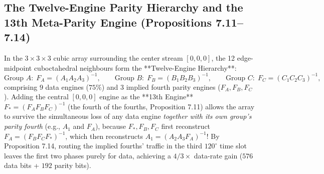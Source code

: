 \documentclass[11pt, a4paper]{article}
\begin{document}
\subsection{The Twelve-Engine Parity Hierarchy and the 13th Meta-Parity Engine (Propositions 7.11--7.14)}
In the $3\times 3\times 3$ cubic array surrounding the center stream $[0,0,0]$, the 12 edge-midpoint cuboctahedral neighbours form the **Twelve-Engine Hierarchy**:
\begin{equation}
\text{Group } A: \; F_A = (A_1 A_2 A_3)^{-1}, \qquad \text{Group } B: \; F_B = (B_1 B_2 B_3)^{-1}, \qquad \text{Group } C: \; F_C = (C_1 C_2 C_3)^{-1},
\end{equation}
comprising $9$ data engines ($75\%$) and $3$ implied fourth parity engines ($F_A, F_B, F_C$). Adding the central $[0,0,0]$ engine as the **13th Engine** $F_* = (F_A F_B F_C)^{-1}$ (the fourth of the fourths, Proposition 7.11) allows the array to survive the simultaneous loss of any data engine \textit{together with its own group's parity fourth} (e.g., $A_1$ and $F_A$), because $F_*, F_B, F_C$ first reconstruct $F_A = (F_B F_C F_*)^{-1}$, which then reconstructs $A_1 = (A_2 A_3 F_A)^{-1}$! By Proposition 7.14, routing the implied fourths' traffic in the third $120^\circ$ time slot leaves the first two phases purely for data, achieving a $4/3\times$ data-rate gain ($576$ data bits + $192$ parity bits).
\end{document}
